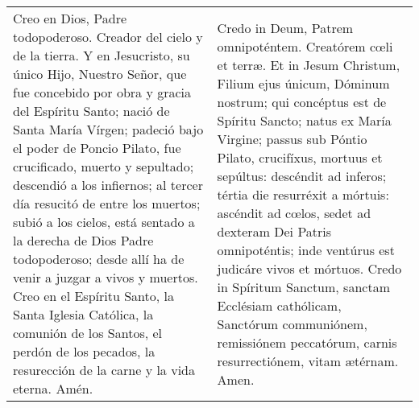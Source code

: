 \documentclass[../devocionario.tex]{subfiles}
\begin{document}
    \begin{longtable} { p{} p{} }
        Creo en Dios, Padre todopoderoso. Creador del cielo y de la tierra. Y en Jesucristo, su único Hijo, Nuestro Señor, 
        que fue concebido por obra y gracia del Espíritu Santo; nació de Santa María Vírgen; padeció bajo el poder de Poncio Pilato, 
        fue crucificado, muerto y sepultado; descendió a los infiernos; al tercer día resucitó de entre los muertos; subió a los cielos, 
        está sentado a la derecha de Dios Padre todopoderoso; desde allí ha de venir a juzgar a vivos y muertos. 
        Creo en el Espíritu Santo, la Santa Iglesia Católica, la comunión de los Santos, el perdón de los pecados, 
        la resurección de la carne y la vida eterna. Amén. 
        &
        Credo in Deum, Patrem omnipoténtem. Creatórem cœli et terræ. Et in Jesum Christum, Filium ejus únicum, Dóminum nostrum; 
        qui concéptus est de Spíritu Sancto; natus ex María Virgine; passus sub Póntio Pilato, crucifíxus, mortuus et sepúltus: 
        descéndit ad inferos; tértia die resurréxit a mórtuis: ascéndit ad cœlos, sedet ad dexteram Dei Patris omnipoténtis; 
        inde ventúrus est judicáre vivos et mórtuos. Credo in Spíritum Sanctum, sanctam Ecclésiam cathólicam, Sanctórum communiónem, 
        remissiónem peccatórum, carnis resurrectiónem, vitam ætérnam. Amen.
    \end{longtable}
\end{document}
